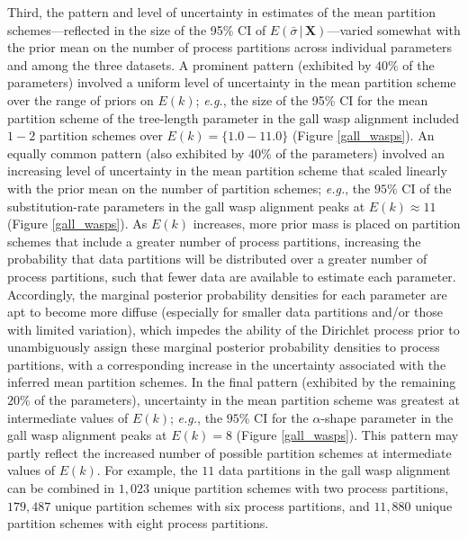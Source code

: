 \documentclass[11pt]{article}
\newcommand{\given}{\ensuremath{\,|\,}}
\begin{document}
Third, the pattern and level of uncertainty in estimates of the mean partition schemes---reflected in the size of the 95\% CI of $E(\bar{\sigma} \given \mathbf{X})$---varied somewhat with the prior mean on the number of process partitions across individual parameters and among the three datasets.  
A prominent pattern (exhibited by $40\%$ of the parameters) involved a uniform level of uncertainty in the mean partition scheme over the range of priors on $E(k)$; {\it e.g.}, the size of the 95\% CI for the mean partition scheme of the tree-length parameter in the gall wasp alignment included $1-2$ partition schemes over $E(k) = \{1.0-11.0\}$ (Figure \ref{gall_wasps}).  
An equally common pattern (also exhibited by $40\%$ of the parameters) involved an increasing level of uncertainty in the mean partition scheme that scaled linearly with the prior mean on the number of partition schemes; {\it e.g.}, the $95\%$ CI of the substitution-rate parameters in the gall wasp alignment peaks at $E(k) \approx 11$ (Figure \ref{gall_wasps}).  
As $E(k)$ increases, more prior mass is placed on partition schemes that include a greater number of process partitions, increasing the probability that data partitions will be distributed over a greater number of process partitions, such that fewer data are available to estimate each parameter.  
Accordingly, the marginal posterior probability densities for each parameter are apt to become more diffuse (especially for smaller data partitions and/or those with limited variation), which impedes the ability of the Dirichlet process prior to unambiguously assign these marginal posterior probability densities to process partitions, with a corresponding increase in the uncertainty associated with the inferred mean partition schemes. 
In the final pattern (exhibited by the remaining $20\%$ of the parameters), uncertainty in the mean partition scheme was greatest at intermediate values of $E(k)$; {\it e.g.}, the $95\%$ CI for the $\alpha$-shape parameter in the gall wasp alignment peaks at $E(k) = 8$ (Figure \ref{gall_wasps}).  
This pattern may partly reflect the increased number of possible partition schemes at intermediate values of $E(k)$.  
For example, the $11$ data partitions in the gall wasp alignment can be combined in $1,023$ unique partition schemes with two process partitions, $179,487$ unique partition schemes with six process partitions, and $11,880$ unique partition schemes with eight process partitions.  
\end{document}
